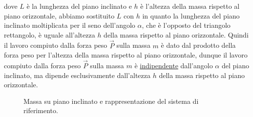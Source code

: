         dove $L$ è la lunghezza del piano inclinato e $h$ è l'altezza della massa rispetto al piano orizzontale, abbiamo sostituito $L$ con $h$ in quanto la lunghezza del piano inclinato moltiplicata per il seno dell'angolo $\alpha$, che è l'opposto del triangolo rettangolo, è uguale all'altezza $h$ della massa rispetto al piano orizzontale. Quindi il lavoro compiuto dalla forza peso $\vec{P}$ sulla massa $m$ è dato dal prodotto della forza peso per l'altezza della massa rispetto al piano orizzontale, dunque il lavoro compiuto dalla forza peso $\vec{P}$ sulla massa $m$ è \underline{indipendente} dall'angolo $\alpha$ del piano inclinato, ma dipende esclusivamente dall'altezza $h$ della massa rispetto al piano orizzontale.
        \begin{figure}[H]
            \centering
            \begin{subfigure}[b]{0.45\textwidth}
            \end{subfigure}
            \begin{subfigure}[b]{0.45\textwidth}
            \end{subfigure}
            \caption{Massa su piano inclinato e rappresentazione del sistema di riferimento.}
        \end{figure}
